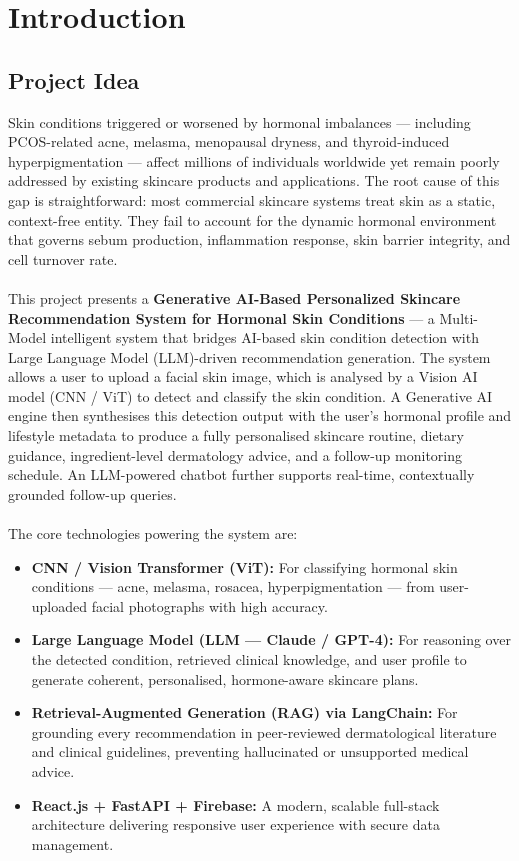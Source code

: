 \chapter{Introduction}
\section{Project Idea}
\hspace*{0.5in}Skin conditions triggered or worsened by hormonal imbalances — including PCOS-related acne, melasma, menopausal dryness, and thyroid-induced hyperpigmentation — affect millions of individuals worldwide yet remain poorly addressed by existing skincare products and applications. The root cause of this gap is straightforward: most commercial skincare systems treat skin as a static, context-free entity. They fail to account for the dynamic hormonal environment that governs sebum production, inflammation response, skin barrier integrity, and cell turnover rate.\\\\
\hspace*{0.5in}This project presents a \textbf{Generative AI-Based Personalized Skincare Recommendation System for Hormonal Skin Conditions} — a Multi-Model intelligent system that bridges AI-based skin condition detection with Large Language Model (LLM)-driven recommendation generation. The system allows a user to upload a facial skin image, which is analysed by a Vision AI model (CNN / ViT) to detect and classify the skin condition. A Generative AI engine then synthesises this detection output with the user's hormonal profile and lifestyle metadata to produce a fully personalised skincare routine, dietary guidance, ingredient-level dermatology advice, and a follow-up monitoring schedule. An LLM-powered chatbot further supports real-time, contextually grounded follow-up queries.\\\\
The core technologies powering the system are:
\begin{itemize}
    \item \textbf{CNN / Vision Transformer (ViT):} For classifying hormonal skin conditions — acne, melasma, rosacea, hyperpigmentation — from user-uploaded facial photographs with high accuracy.

    \item \textbf{Large Language Model (LLM — Claude / GPT-4):} For reasoning over the detected condition, retrieved clinical knowledge, and user profile to generate coherent, personalised, hormone-aware skincare plans.

    \item \textbf{Retrieval-Augmented Generation (RAG) via LangChain:} For grounding every recommendation in peer-reviewed dermatological literature and clinical guidelines, preventing hallucinated or unsupported medical advice.

    \item \textbf{React.js + FastAPI + Firebase:} A modern, scalable full-stack architecture delivering responsive user experience with secure data management.
\end{itemize}
